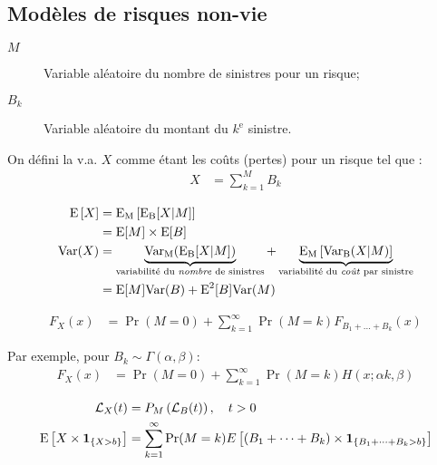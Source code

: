 \documentclass[10pt, french]{article}
\begin{document}
\begin{multicols*}{2}
\pagebreak

\section{Modèles de risques non-vie}
\begin{distributions}[Notation]
\begin{description}
	\item[$M$]	Variable aléatoire du nombre de sinistres pour un risque;
	\item[$B_{k}$]	Variable aléatoire du montant du $k^{\text{e}}$ sinistre.
\end{description}
\end{distributions}

\begin{definitionNOHFILL}
On défini la v.a. $X$ comme étant les coûts (pertes) pour un risque tel que :
\begin{align*}
	X
	&=	\sum_{k	=	1}^{M} B_{k}
\end{align*}

\tcbline

\begin{align*}
	\mathrm{E} \left[ X \right]
	&=	\text{E}_{\text{M}}\left[\text{E}_{\text{B}}[X | M]\right]	\\
	&=	\text{E}[M]	\times	\text{E}[B]	\\
	\text{Var}(X)
	&=	\underbrace{\text{Var}_{\text{M}}(\text{E}_{\text{B}}[X | M])}_{\text{variabilité du \textit{nombre} de sinistres}}	+	\underbrace{\text{E}_{\text{M}}\left[\text{Var}_{\text{B}}(X | M)\right]}_{\text{variabilité du \textit{coût} par sinistre}}	\\
	&=	\text{E}[M]\text{Var}(B)	+	\text{E}^{2}[B]\text{Var}(M)	\\
\end{align*}

\tcbline

\begin{align*}
	F_{X}(x)
	&=	\Pr(M	=	0)	+	\sum_{k	=	1}^{\infty} \Pr(M	=	k)F_{B_{1}	+	\dots	+	B_{k}}(x)
\end{align*}

Par exemple, pour $B_{k}	\sim	\Gamma(\alpha,	\beta)$:
\begin{align*}
	F_{X}(x)
	&=	\Pr(M	=	0)	+	\sum_{k	=	1}^{\infty} \Pr(M	=	k)H(x;	\alpha k, \beta)
\end{align*}

\tcbline

\begin{align*}
	\mathcal{L}_{X}(t)
	&=	P_{M}\left(\mathcal{L}_{B}(t)\right), \quad	t > 0	\\
	\mathrm{E} \left[ X	\times	\bm{1}_{\{X	>	b\}} \right]
	&=	\sum_{k	=	1}^{\infty} \Pr(M	=	k)E\left[(B_{1}	+	\dots	+	B_{k})	\times	\bm{1}_{\{B_{1}	+	\dots	+	B_{k} > b\}}\right]
\end{align*}


\end{definitionNOHFILL}
\end{multicols*}
\end{document}

